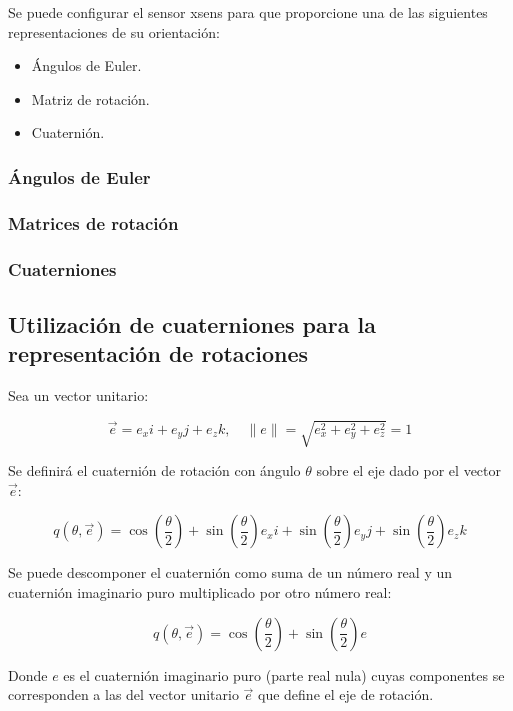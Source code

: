 \documentclass[10pt, a4paper]{report}
\begin{document}
Se puede configurar el sensor xsens para que proporcione una de las siguientes representaciones de su orientación:

\begin{itemize}

\item Ángulos de Euler.
\item Matriz de rotación.
\item Cuaternión. 

\end{itemize}

\subsubsection{Ángulos de Euler}
\subsubsection{Matrices de rotación}
\subsubsection{Cuaterniones}

\subsection{Utilización de cuaterniones para la representación de rotaciones}

Sea un vector unitario:

$$ \vec{e} = e_x i + e_y j + e_z k, \quad \|e\| = \sqrt{e_x^2 + e_y^2 + e_z^2} = 1 $$

Se definirá el cuaternión de rotación con ángulo $\theta$ sobre el eje dado por el vector $\vec{e}$:

$$ q(\theta, \vec{e}) = \cos \left(\frac{\theta}{2}\right) + \sin \left(\frac{\theta}{2}\right) e_x i + \sin \left(\frac{\theta}{2}\right) e_y j + \sin \left(\frac{\theta}{2}\right) e_z k$$

Se puede descomponer el cuaternión como suma de un número real y un cuaternión imaginario puro multiplicado por otro número real:

$$ q(\theta, \vec{e}) = \cos \left(\frac{\theta}{2}\right) + \sin \left(\frac{\theta}{2}\right) e  $$

Donde $e$ es el cuaternión imaginario puro (parte real nula) cuyas componentes se corresponden a las del vector unitario $\vec{e}$ que define el eje de rotación.\\
\end{document}
